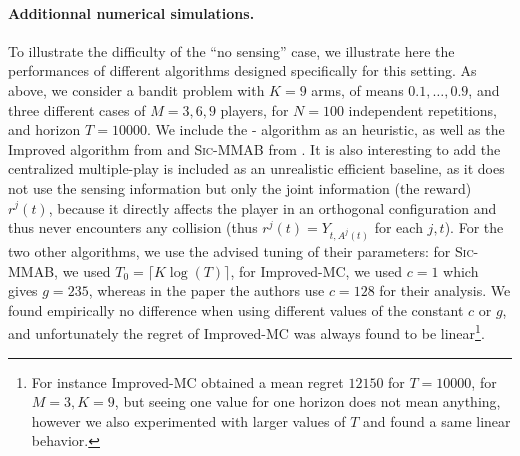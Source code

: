 \paragraph{Additionnal numerical simulations.}

To illustrate the difficulty of the ``no sensing'' case, we illustrate here the performances of different algorithms designed specifically for this setting.
As above, we consider a bandit problem with $K=9$ arms, of means $0.1,\dots,0.9$, and three different cases of $M=3,6,9$ players, for $N=100$ independent repetitions, and horizon $T=10000$.
We include the \Selfish-\klUCB{} algorithm as an heuristic, as well as the Improved \MusicalChair{} algorithm from \cite{LugosiMehrabian18} and \textsc{Sic-MMAB} from \cite{BoursierPerchet18}.
It is also interesting to add the centralized multiple-play \klUCB{} is included as an unrealistic efficient baseline, as it does not use the sensing information but only the joint information (the reward) $r^j(t)$, because it directly affects the player in an orthogonal configuration and thus never encounters any collision (thus $r^j(t)=Y_{t,A^j(t)}$ for each $j,t$).
%
For the two other algorithms, we use the advised tuning of their parameters:
for \textsc{Sic-MMAB}, we used $T_0 = \lceil K \log(T) \rceil$,
for Improved-MC, we used $c=1$ which gives $g=235$, whereas in the paper the authors use $c=128$ for their analysis.
We found empirically no difference when using different values of the constant $c$ or $g$, and unfortunately the regret of Improved-MC was always found to be linear\footnote{For instance Improved-MC obtained a mean regret $12150$ for $T=10000$, for $M=3,K=9$, but seeing one value for one horizon does not mean anything, however we also experimented with larger values of $T$ and found a same linear behavior.}.


